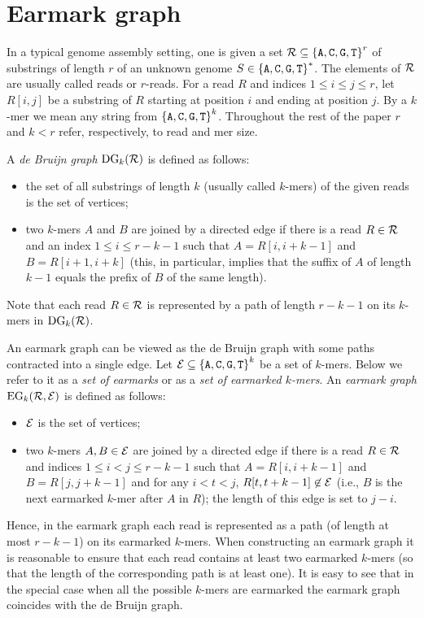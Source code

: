 \documentclass[12pt]{article}
\def\acgt{\{{\tt A,C,G,T}\}}
\begin{document}
\section{Earmark graph}
In a typical genome assembly setting, one is given a set 
${\cal R} \subseteq {\acgt}^r$ 
of substrings of length $r$ of an unknown genome $S \in {\acgt}^*$.
The elements of ${\cal R}$ are usually called reads or $r$-reads.
For a read $R$ and indices $1 \le i \le j \le r$,
let $R[i,j]$ be a substring of $R$ starting at position $i$
and ending at position $j$. By a $k$-mer we mean any string from
${\acgt}^k$. Throughout the rest of the paper $r$ and $k<r$
refer, respectively, to read and mer size.

A \emph{de Bruijn graph} $\textrm{DG}_k({\cal R})$ is defined as follows:
\begin{itemize}
\item the set of all substrings of length $k$ (usually called $k$-mers) of the given reads is the 
set of vertices; 
\item two $k$-mers $A$ and $B$ are joined by a directed edge if there is a
read $R \in {\cal R}$ and an index $1 \le i \le r-k-1$ such that
$A=R[i,i+k-1]$ and $B=R[i+1,i+k]$
(this, in particular, implies that
the suffix of $A$ of length $k-1$ equals the prefix of $B$ of the same length).
\end{itemize}
Note that each read $R \in {\cal R}$ is represented by a path of length $r-k-1$
on its $k$-mers in $\textrm{DG}_k({\cal R})$.


An earmark graph can be viewed as the de Bruijn graph
with some paths contracted into a single edge.
Let ${\cal E} \subseteq {\acgt}^k$ be a set of $k$-mers.
Below we refer to it as a \emph{set of earmarks} or as a \emph{set of earmarked $k$-mers}. 
An \emph{earmark graph} $\textrm{EG}_k({\cal R}, {\cal E})$ is defined as follows:
\begin{itemize}
\item ${\cal E}$ is the set of vertices;
\item two $k$-mers $A, B \in {\cal E}$ are joined by a directed edge if there is a read $R \in {\cal R}$
and indices $1 \le i < j \le r-k-1$ such that
$A=R[i,i+k-1]$ and $B=R[j,j+k-1]$ and 
for any $i < t < j$, $R[t,t+k-1] \not \in {\cal E}$
(i.e., $B$ is the next earmarked $k$-mer after $A$ in $R$); the length of this edge is set to
$j-i$.
\end{itemize}
Hence, in the earmark graph each read is represented as a path (of length at most $r-k-1$) on its earmarked $k$-mers.
When constructing an earmark graph it is reasonable to ensure that each read contains at least two 
earmarked $k$-mers (so that the length of the corresponding path is at least one).
It is easy to see that in the special case when all the possible $k$-mers are earmarked
the earmark graph coincides with the de Bruijn graph.
\end{document}
